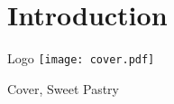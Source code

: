 \documentclass[
    ref = refDemo,
]{spBeamer}
\begin{document}
    \section{Introduction}
        \begin{frame}{Logo}
                \texttt{[image: cover.pdf]}
                \caption{Cover, Sweet Pastry}
        \end{frame}
    
\end{document}

